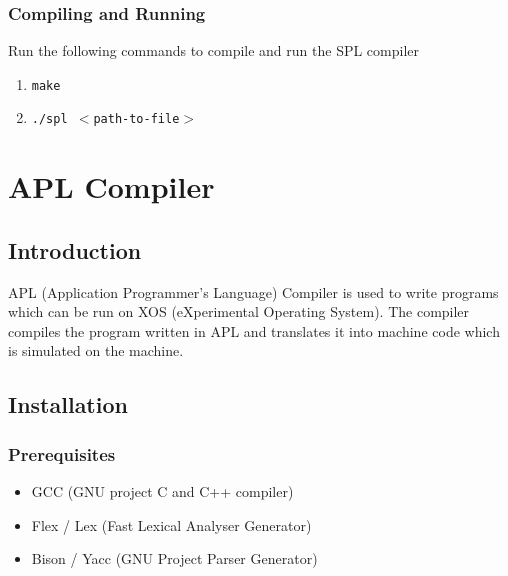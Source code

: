 \documentclass[11pt]{report}
\begin{document}
\subsection{Compiling and Running}
Run the following commands to compile and run the SPL compiler
\begin{enumerate}
		\item \texttt{make}
		\item \texttt{./spl $<$path-to-file$>$ }
\end{enumerate}


\chapter{APL Compiler}

\section{Introduction}
APL (Application Programmer's Language) Compiler is used to write programs which can be run on XOS (eXperimental Operating System). The compiler compiles the program written in APL and translates it into machine code which is simulated on the machine.

\section{Installation}

\subsection{Prerequisites}
\begin{itemize}
	\item GCC  (GNU project C and C++ compiler)
	\item Flex / Lex  (Fast Lexical Analyser Generator)
	\item Bison / Yacc  (GNU Project Parser Generator)
\end{itemize} 

\end{document}
